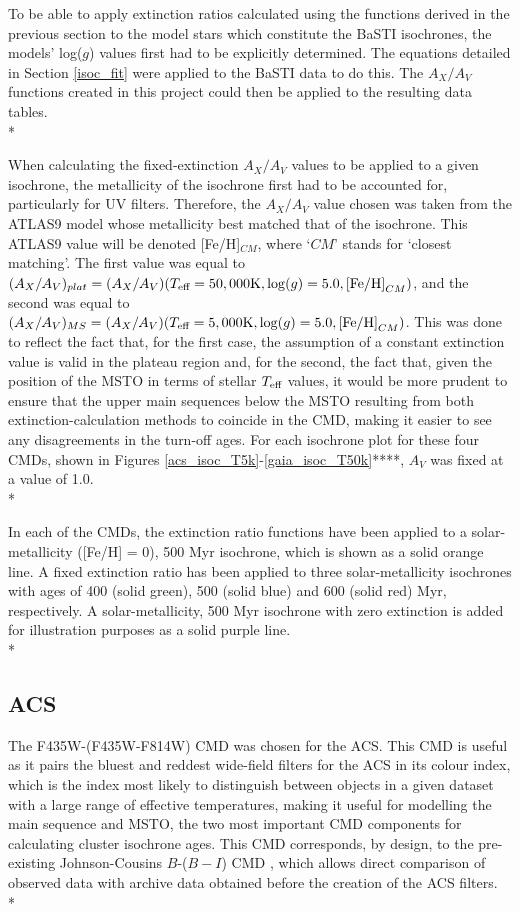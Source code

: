 \documentclass[12pt, a4paper]{report}
\begin{document}
To be able to apply extinction ratios calculated using the functions derived in the previous section to the model stars which constitute the BaSTI isochrones, the models' log($g$) values first had to be explicitly determined. The equations detailed in Section \ref{isoc_fit} were applied to the BaSTI data to do this. The $A_{X}/A_{V}$ functions created in this project could then be applied to the resulting data tables. \\*

When calculating the fixed-extinction $A_{X}/A_{V}$ values to be applied to a given isochrone, the metallicity of the isochrone first had to be accounted for, particularly for UV filters. Therefore, the $A_{X}/A_{V}$ value chosen was taken from the ATLAS9 model whose metallicity best matched that of the isochrone. This ATLAS9 value will be denoted [Fe/H]$_{CM}$, where `$CM$' stands for `closest matching'. The first value was equal to $(A_{X}/A_{V})_{plat} = (A_{X}/A_{V})(T_{\textnormal{eff}} = 50,000\textnormal{K},\log(g) = 5.0,\textnormal{[Fe/H]}_{CM})$, and the second was equal to $(A_{X}/A_{V})_{MS} = (A_{X}/A_{V})(T_{\textnormal{eff}} = 5,000\textnormal{K},\log(g) = 5.0,\textnormal{[Fe/H]}_{CM})$. This was done to reflect the fact that, for the first case, the assumption of a constant extinction value is valid in the plateau region and, for the second, the fact that, given the position of the MSTO in terms of stellar $T_{\textnormal{eff}}$ values, it would be more prudent to ensure that the upper main sequences below the MSTO resulting from both extinction-calculation methods to coincide in the CMD, making it easier to see any disagreements in the turn-off ages. For each isochrone plot for these four CMDs, shown in Figures \ref{acs_isoc_T5k}-\ref{gaia_isoc_T50k}****, $A_{V}$ was fixed at a value of 1.0.\\*

In each of the CMDs, the extinction ratio functions have been applied to a solar-metallicity ([Fe/H] = 0), 500 Myr isochrone, which is shown as a solid orange line. A fixed extinction ratio has been applied to three solar-metallicity isochrones with ages of 400 (solid green), 500 (solid blue) and 600 (solid red) Myr, respectively. A solar-metallicity, 500 Myr isochrone with zero extinction is added for illustration purposes as a solid purple line.\\*

\subsection{ACS} \label{ACS_isoc}
The F435W-(F435W-F814W) CMD was chosen for the ACS. This CMD is useful as it pairs the bluest and reddest wide-field filters for the ACS in its colour index, which is the index most likely to distinguish between objects in a given dataset with a large range of effective temperatures, making it useful for modelling the main sequence and MSTO, the two most important CMD components for calculating cluster isochrone ages. This CMD corresponds, by design, to the pre-existing Johnson-Cousins $B$-($B-I$) CMD \citep{2005PASP..117.1049S}, which allows direct comparison of observed data with archive data obtained before the creation of the ACS filters.\\*
\end{document}
